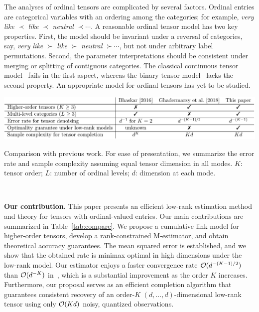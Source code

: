 \documentclass{article}
\theoremstyle{plain}
\theoremstyle{definition}
\begin{document}
The analyses of ordinal tensors are complicated by several factors. Ordinal entries are categorical variables with an ordering among the categories; for example, {\it very like} $\prec$ {\it like} $\prec$ {\it neutral} $\prec \cdots$. A reasonable ordinal tensor model has two key properties. First, the model should be invariant under a reversal of categories, say, {\it very like} $\succ$ {\it like} $\succ$ {\it neutral} $\succ \cdots$, but not under arbitrary label permutations. Second, the parameter interpretations should be consistent under merging or splitting of contiguous categories. The classical continuous tensor model~\cite{kolda2009tensor, ghadermarzy2019near} fails in the first aspect, whereas the binary tensor model~\cite{ghadermarzy2018learning} lacks the second property. An appropriate model for ordinal tensors has yet to be studied. 

\begin{table}[ht]
\centerline{\includegraphics[width=16cm]{compare.pdf}}
\vspace{-.3cm}
\caption{Comparison with previous work. For ease of presentation, we summarize the error rate and sample complexity assuming equal tensor dimension in all modes. $K$: tensor order; $L$: number of ordinal levels; $d$: dimension at each mode. }~\label{tab:compare}
\vspace{-.5cm}
\end{table}

{\bf Our contribution.} This paper presents an efficient low-rank estimation method and theory for tensors with ordinal-valued entries. Our main contributions are summarized in Table~\ref{tab:compare}. We propose a cumulative link model for higher-order tensors, develop a rank-constrained M-estimator, and obtain theoretical accuracy guarantees. The mean squared error is established, and we show that the obtained rate is minimax optimal in high dimensions under the low-rank model. Our estimator enjoys a faster convergence rate $\mathcal{O}(d^{-(K-1)/2})$ than $\mathcal{O}(d^{-K})$ in~\citet{ghadermarzy2018learning}, which is a substantial improvement as the order $K$ increases. Furthermore, our proposal serves as an efficient completion algorithm that guarantees consistent recovery of an order-$K$ $(d,\ldots,d)$-dimensional low-rank tensor using only $\mathcal{O}(Kd)$ noisy, quantized observations. 
\end{document}
